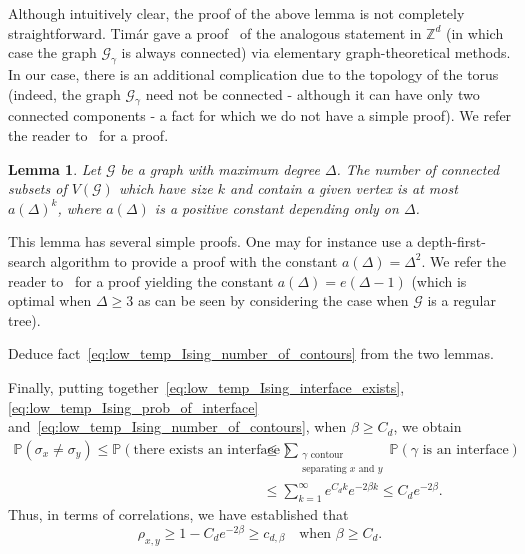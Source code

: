 \documentclass[12pt,reqno]{article}
\def\Z{\mathbb{Z}}
\newtheorem{lemma}[theorem]{Lemma}
\renewcommand{\Pr}{\mathbb{P}}
\begin{document}
Although intuitively clear, the proof of the above lemma is not
completely straightforward. Tim{\'a}r gave a proof~\cite{Tim13} of the analogous statement in $\Z^d$ (in which case the graph $\mathcal{G}_\gamma$ is always connected) via elementary graph-theoretical methods. In our case, there is an additional complication due to the topology of the torus (indeed, the graph $\mathcal{G}_\gamma$ need not be connected - although it can have only two connected components - a fact for which we do not have a simple proof). We refer the reader to~\cite{Pel10} for a proof.


\begin{lemma}\label{lem:count_connected_subgraphs}
    Let $\mathcal{G}$ be a graph with maximum degree $\Delta$. The number of connected subsets of $V(\mathcal{G})$ which have size $k$ and contain a given vertex is at most $a(\Delta)^k$, where $a(\Delta)$ is a positive constant depending only on $\Delta$.
\end{lemma}

This lemma has several simple proofs. One may for instance use a depth-first-search algorithm to provide a proof with the constant $a(\Delta)=\Delta^2$. We refer the reader to~\cite[Chapter~45]{Bol06} for a proof yielding the constant $a(\Delta)=e(\Delta-1)$ (which is optimal when $\Delta \ge 3$ as can be seen by considering the case when $\mathcal{G}$ is a regular tree).


\medbreak
{}
Deduce fact~\eqref{eq:low_temp_Ising_number_of_contours} from the two lemmas.
\medbreak



Finally, putting together~\eqref{eq:low_temp_Ising_interface_exists}, \eqref{eq:low_temp_Ising_prob_of_interface} and~\eqref{eq:low_temp_Ising_number_of_contours}, when $\beta \ge C_d$, we obtain
\begin{align*}
\Pr(\sigma_x \neq \sigma_y)
 \le \Pr(\text{there exists an interface})
 &\le \sum_{\substack{\gamma\text{ contour}\\\text{separating $x$ and $y$}}} \Pr(\gamma\text{ is an interface}) \\
 &\le \sum_{k=1}^\infty e^{C_d k} e^{-2\beta k} \le C_d e^{-2\beta} .
\end{align*}
Thus, in terms of correlations, we have established that
\[ \rho_{x,y} \ge 1 - C_d e^{-2\beta} \ge c_{d,\beta} \quad\text{when }\beta \ge C_d .\]
\end{document}
